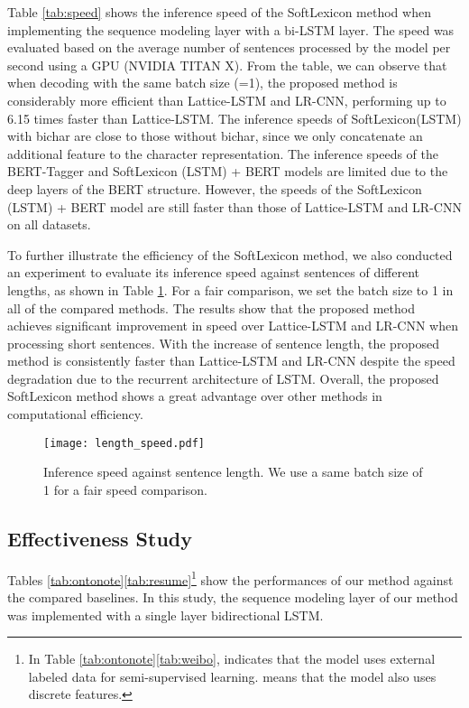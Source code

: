 \documentclass[11pt,a4paper]{article}
\begin{document}
\begin{CJK}{UTF8}{gbsn}
Table \ref{tab:speed} shows the inference speed of the SoftLexicon method when implementing the sequence modeling layer with a bi-LSTM layer. The speed was evaluated based on the average number of sentences processed by the model per second using a GPU (NVIDIA TITAN X). 
From the table, we can observe that when decoding with the same batch size (=1), the proposed method is considerably more efficient than Lattice-LSTM and LR-CNN, performing up to 6.15 times faster than Lattice-LSTM. The inference speeds of SoftLexicon(LSTM) with bichar are close to those without bichar, since we only concatenate an additional feature to the character representation. The inference speeds of the BERT-Tagger and SoftLexicon (LSTM) + BERT models are limited due to the deep layers of the BERT structure. However, the speeds of the SoftLexicon (LSTM) + BERT model are still faster than those of Lattice-LSTM and LR-CNN on all datasets.




To further illustrate the efficiency of the SoftLexicon method, we also conducted an experiment to evaluate its inference speed against sentences of different lengths, as shown in Table \ref{fig:lengthtest}. For a fair comparison, we set the batch size to 1 in all of the compared methods. The results show that the proposed method achieves significant improvement in speed over Lattice-LSTM and LR-CNN when processing short sentences. With the increase of sentence length, the proposed method is consistently faster than Lattice-LSTM and LR-CNN despite the speed degradation due to the recurrent architecture of LSTM. Overall, the proposed SoftLexicon method shows a great advantage over other methods in computational efficiency.


\begin{figure}
\centering
\texttt{[image: length\_speed.pdf]}
\caption{Inference speed against sentence length. We use a same batch size of 1 for a fair speed comparison. }
\label{fig:lengthtest}
\end{figure}





\subsection{Effectiveness Study}

Tables \ref{tab:ontonote}\ref{tab:resume}\footnote{In Table  \ref{tab:ontonote}\ref{tab:weibo},  indicates that the model uses external labeled data for semi-supervised learning. 
 means that the model also uses discrete features.} show the performances of our method against the compared baselines. In this study, the sequence modeling layer of our method was implemented with a single layer bidirectional LSTM.




\end{CJK}
\end{document}
